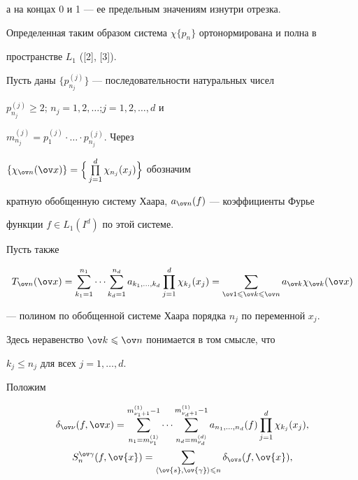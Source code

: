 а на концах 0 и 1 --- ее предельным значениям изнутри отрезка.


Определенная таким образом система $\chi\{p_{n}\}$ ортонормирована и полна в 


пространстве $L_{1}$ ([2], [3]).





Пусть даны $\{p_{n_{j}}^{(j)}\}$ --- последовательности натуральных чисел


$p_{n_{j}}^{(j)} \geq 2$; $n_{j}=1,2,\dotsc$;\linebreak $j=1,2,\dotsc,d$ и 


$m_{n_{j}}^{(j)}=p_{1}^{(j)}\cdot\dotsc\cdot p_{n_{j}}^{(j)}$. Через 


$\{\chi_{\ov n}(\ov 


x)\}=\Big\{\prod\limits_{j=1}^{d}\chi_{n_{j}}(x_{j})\Big\}$ обозначим 


кратную обобщенную систему Хаара, $a_{\ov n}(f)$ --- коэффициенты Фурье 


функции $f\in L_{1}(I^{d})$ по этой системе.


Пусть также


$$


T_{\ov n}(\ov 


x)=\sum_{k_{1}=1}^{n_{1}}\dotsb\sum_{k_{d}=1}^{n_{d}}a_{k_{1},\dotsc,k_{d}} 


\prod_{j=1}^{d}\chi_{k_{j}}(x_{j})=\sum_{\ov 1\leq\ov k\leq\ov n}a_{\ov 


k}\chi_{\ov k}(\ov x)


$$


--- полином по обобщенной системе Хаара порядка $n_{j}$ по переменной $x_{j}$. 


Здесь неравенство $\ov k\leq\ov n$ понимается в том смысле, что 


$k_{j}\leq n_{j}$ для всех $j=1,\dotsc,d$. 





Положим 


\begin{gather*}


\delta_{\ov \nu}(f,\ov x)=\sum_{n_{1}= 


m_{\nu_{1}}^{(1)}}^{m_{\nu_{1}+1}^{(1)}-1}\dotsb\sum_{n_{d}= 


m_{\nu_{d}}^{(d)}}^{m_{\nu_{d}+1}^{(1)}-1}a_{n_{1},\dotsc,n_{d}}(f) 


\prod_{j=1}^{d}\chi_{k_{j}}(x_{j}),\\


%


S_{n}^{\ov\gamma}(f,\ov{x})=\sum_{\la\ov{s},\ov{\gamma}\ra\leq 


n}\delta_{\ov s}(f,\ov{x}),


\end{gather*}


